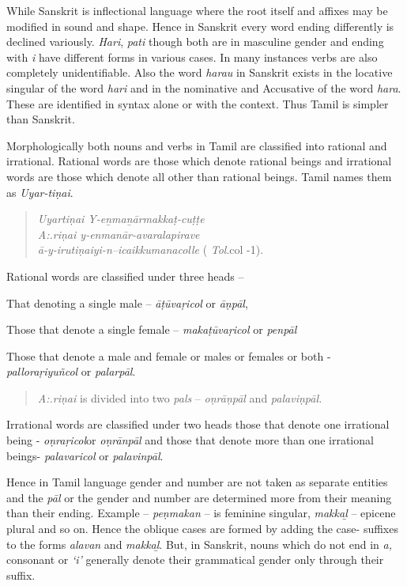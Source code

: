 While Sanskrit is inflectional language where the root itself and affixes may be modified in sound and shape. Hence in Sanskrit every word ending differently is declined variously. \textit{Hari}, \textit{pati} though both are in masculine gender and ending with \textit{i} have different forms in various cases. In many instances verbs are also completely unidentifiable. Also the word \textit{harau} in Sanskrit exists in the locative singular of the word \textit{hari} and in the nominative and Accusative of the word \textit{hara}. These are identified in syntax alone or with the context. Thus Tamil is simpler than Sanskrit.

Morphologically both nouns and verbs in Tamil are classified into rational and irrational. Rational words are those which denote rational beings and irrational words are those which denote all other than rational beings. Tamil names them as \textit{Uyar-tiṇai}.

\begin{verse}
\textit{Uyartiṇai Y-eṉmaṉārmakkaṭ-cuṭṭe}\\\textit{ A:.riṇai y-enmanār-avaralapirave}\\\textit{ā-y-irutiṇaiyi-n--icaikkumanacolle} ( \textit{Tol}.col -1).
\end{verse}

Rational words are classified under three heads –

That denoting a single male – \textit{āṭūvaṛicol} or \textit{āṇpāl},

Those that denote a single female – \textit{makaṭūvaṛicol} or \textit{penpāl}

 Those that denote a male and female or males or females or both - \textit{palloraṛiyuñcol} or \textit{palarpāl}.

\begin{verse}
\textit{A:.riṇai} is divided into two \textit{pals} – \textit{oṇrāṇpāl} and \textit{palaviṇpāl.}
\end{verse}

Irrational words are classified under two heads those that denote one irrational being - \textit{oṇraṛicol}or \textit{oṇrānpāl} and those that denote more than one irrational beings- \textit{palavaricol} or \textit{palavinpāl}.

Hence in Tamil language gender and number are not taken as separate entities and the \textit{pāl} or the gender and number are determined more from their meaning than their ending. Example – \textit{peṇmakan} – is feminine singular, \textit{makkaḻ} – epicene plural and so on. Hence the oblique cases are formed by adding the case- suffixes to the forms \textit{alavan} and \textit{makkaḻ}. But, in Sanskrit, nouns which do not end in \textit{a,} consonant or \textit{‘i’} generally denote their grammatical gender only through their suffix.

